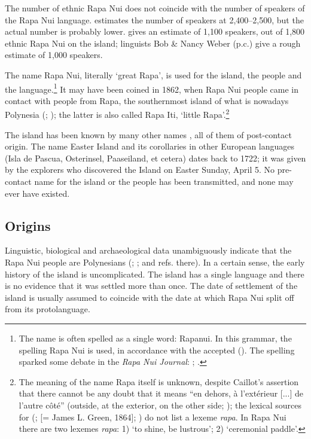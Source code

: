 The number of ethnic Rapa Nui does not coincide with the number of speakers of the Rapa Nui language. \citet{Wurm2007} estimates the number of speakers at 2,400–2,500, but the actual number is probably lower. \citet[192]{Makihara2001Adaptation} gives an estimate of 1,100 speakers, out of 1,800 ethnic Rapa Nui on the island; linguists Bob \& Nancy Weber (p.c.) give a rough estimate of 1,000 speakers.

The name Rapa Nui, literally ‘great Rapa’, is used for the island, the people and the language.\footnote{\label{fn:3}The name is often spelled as a single word: Rapanui. In this grammar, the spelling Rapa Nui is used, in accordance with the accepted  (). The spelling sparked some debate in the \textit{Rapa Nui Journal}: \citet{Fischer1991,Fischer1993Or,Fischer1993Hoki}; \citet{WeberWeber1991}.} It may have been coined in 1862, when Rapa Nui people came in contact  
with people from Rapa, the southernmost island of what is nowadays  Polynesia (\citealt[64]{Fischer1993Naming}; \citealt[91]{Fischer2005}); the latter is also called Rapa Iti, ‘little Rapa’.\footnote{\label{fn:4}The meaning of the name Rapa itself is unknown, despite Caillot’s assertion that there cannot be any doubt that it means “en dehors, à l’extérieur [...] de l’autre côté” (outside, at the exterior, on the other side; \citealt[69]{Caillot1932}); the lexical sources for  (\citealt{Stokes1955}; \citealt{Fischer1996Green} [= James L. Green, 1864]; \citealt{KievietKieviet2006}) do not list a lexeme \textit{rapa}. In Rapa Nui there are two lexemes \textit{rapa}: 1) ‘to shine, be lustrous’; 2) ‘ceremonial paddle’.} 

The island has been known by many other names \citep{Fischer1993Naming}, all of them of post-contact origin. The name Easter Island and its corollaries in other European languages (Isla de Pascua, Osterinsel, Paaseiland, et cetera) dates back to 1722; it was given by the  explorers who discovered the Island on Easter Sunday, April 5. No pre-contact name for the island or the people has been transmitted, and none may ever have existed.

\subsection{Origins}\label{sec:1.1.2}
\largerpage
Linguistic, biological and archaeological data unambiguously indicate that the Rapa Nui people are Polynesians (\citealt{Green2000}; \citealt{Kirch2000}; \citealt{StefanCollinsCuny2002} and refs. there). In a certain sense, the early history of the island is uncomplicated. The island has a single language and there is no evidence that it was settled more than once. The date of settlement of the island is usually assumed to coincide with the date at which Rapa Nui split off from its protolanguage. 

